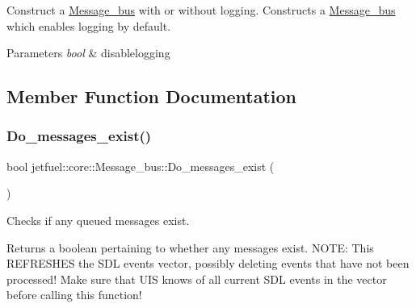 Construct a \hyperlink{classjetfuel_1_1core_1_1Message__bus}{Message\+\_\+bus} with or without logging. Constructs a \hyperlink{classjetfuel_1_1core_1_1Message__bus}{Message\+\_\+bus} which enables logging by default. 


\begin{DoxyParams}{Parameters}
{\em bool} & disablelogging \\
\hline
\end{DoxyParams}


\subsection{Member Function Documentation}
\mbox{\label{classjetfuel_1_1core_1_1Message__bus_a81015af8f393e028c4e9e670167aa013}} 
\subsubsection{\texorpdfstring{Do\+\_\+messages\+\_\+exist()}{Do\_messages\_exist()}}
{\footnotesize\ttfamily bool jetfuel\+::core\+::\+Message\+\_\+bus\+::\+Do\+\_\+messages\+\_\+exist (\begin{DoxyParamCaption}{ }\end{DoxyParamCaption})\hspace{0.3cm}{\ttfamily [inline]}}



Checks if any queued messages exist. 

Returns a boolean pertaining to whether any messages exist. N\+O\+TE\+: This R\+E\+F\+R\+E\+S\+H\+ES the S\+DL events vector, possibly deleting events that have not been processed! Make sure that U\+IS knows of all current S\+DL events in the vector before calling this function! \mbox{\label{classjetfuel_1_1core_1_1Message__bus_a0b91a46865f5888bd1c3e2e3bdbc49ee}} 
